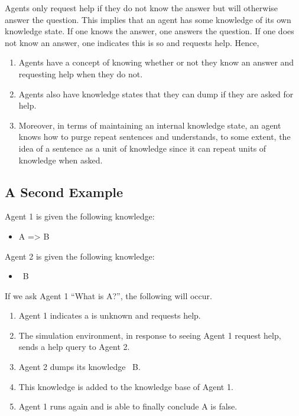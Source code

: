 \documentclass{article}
\begin{document}
Agents only request help if they do not know the answer but will otherwise answer the question. This implies that an agent has some knowledge of its own knowledge state. If one knows the answer, one answers the question. If one does not know an answer, one indicates this is so and requests help. Hence,

\begin{enumerate}
	\item Agents have a concept of knowing whether or not they know an answer and requesting help when they do not.
	\item Agents also have knowledge states that they can dump if they are asked for help.
	\item Moreover, in terms of maintaining an internal knowledge state, an agent knows how to purge repeat sentences and understands, to some extent, the idea of a sentence as a unit of knowledge since it can repeat units of knowledge when asked.
\end{enumerate}

\subsection{A Second Example}
\label{example_2}

Agent 1 is given the following knowledge:

\begin{itemize}
	\item A => B
\end{itemize}

Agent 2 is given the following knowledge:

\begin{itemize}
	\item ~B
\end{itemize}

If we ask Agent 1 “What is A?”, the following will occur.

\begin{enumerate}
	\item Agent 1 indicates a is unknown and requests help.
	\item The simulation environment, in response to seeing Agent 1 request help, sends a help query to Agent 2.
	\item Agent 2 dumps its knowledge ~B.
	\item This knowledge is added to the knowledge base of Agent 1.
	\item Agent 1 runs again and is able to finally conclude A is false.
\end{enumerate}
\end{document}

